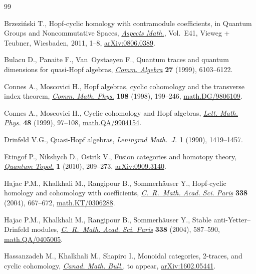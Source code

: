 \begin{thebibliography}{99}
\footnotesize\itemsep=0pt

Brzezi\'nski T., Hopf-cyclic homology with contramodule coefficients, in
 Quantum Groups and Noncommutative Spaces, \href{https://doi.org/10.1007/978-3-8348-9831-9_1}{\textit{Aspects Math.}}, Vol.~E41,
 Vieweg + Teubner, Wiesbaden, 2011, 1--8, \href{https://arxiv.org/abs/0806.0389}{arXiv:0806.0389}.

Bulacu D., Panaite F., Van~Oystaeyen F., Quantum traces and quantum dimensions
 for quasi-{H}opf algebras, \href{https://doi.org/10.1080/00927879908826809}{\textit{Comm. Algebra}} \textbf{27} (1999),
 6103--6122.

Connes A., Moscovici H., Hopf algebras, cyclic cohomology and the transverse
 index theorem, \href{https://doi.org/10.1007/s002200050477}{\textit{Comm. Math. Phys.}} \textbf{198} (1998), 199--246,
 \href{https://arxiv.org/abs/math.DG/9806109}{math.DG/9806109}.

Connes A., Moscovici H., Cyclic cohomology and {H}opf algebras, \href{https://doi.org/10.1023/A:1007527510226}{\textit{Lett.
 Math. Phys.}} \textbf{48} (1999), 97--108, \href{https://arxiv.org/abs/math.QA/9904154}{math.QA/9904154}.

Drinfeld V.G., Quasi-{H}opf algebras, \textit{Leningrad Math.~J.} \textbf{1}
 (1990), 1419--1457.

Etingof P., Nikshych D., Ostrik V., Fusion categories and homotopy theory,
 \href{https://doi.org/10.4171/QT/6}{\textit{Quantum Topol.}} \textbf{1} (2010), 209--273, \href{https://arxiv.org/abs/0909.3140}{arXiv:0909.3140}.

Hajac P.M., Khalkhali M., Rangipour B., Sommerh\"auser Y., Hopf-cyclic homology
 and cohomology with coefficients, \href{https://doi.org/10.1016/j.crma.2003.11.036}{\textit{C.~R.~Math. Acad. Sci. Paris}}
 \textbf{338} (2004), 667--672, \href{https://arxiv.org/abs/math.KT/0306288}{math.KT/0306288}.

Hajac P.M., Khalkhali M., Rangipour B., Sommerh\"auser Y., Stable
 anti-{Y}etter--{D}rinfeld modules, \href{https://doi.org/10.1016/j.crma.2003.11.037}{\textit{C.~R.~Math. Acad. Sci. Paris}}
 \textbf{338} (2004), 587--590, \href{https://arxiv.org/abs/math.QA/0405005}{math.QA/0405005}.

Hassanzadeh M., Khalkhali M., Shapiro I., Monoidal categories, 2-traces, and
 cyclic cohomology, \href{http://dx.doi.org/10.4153/CMB-2018-016-4}{\textit{Canad. Math. Bull.}}, {t}o appear,
 \href{https://arxiv.org/abs/1602.05441}{arXiv:1602.05441}.


\end{thebibliography}
